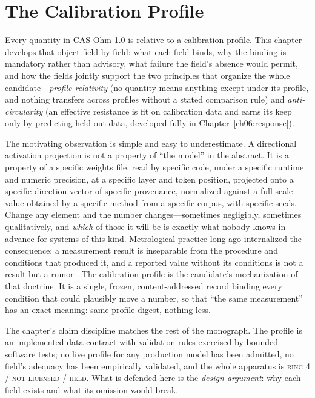 \chapter{The Calibration Profile}\label{ch05:profile}

Every quantity in CAS-Ohm 1.0 is relative to a calibration profile. This
chapter develops that object field by field: what each field binds, why the
binding is mandatory rather than advisory, what failure the field's absence
would permit, and how the fields jointly support the two principles that
organize the whole candidate---\emph{profile relativity} (no quantity means
anything except under its profile, and nothing transfers across profiles
without a stated comparison rule) and \emph{anti-circularity} (an effective
resistance is fit on calibration data and earns its keep only by predicting
held-out data, developed fully in Chapter~\ref{ch06:response}).

The motivating observation is simple and easy to underestimate. A
directional activation projection is not a property of ``the model'' in the
abstract. It is a property of a specific weights file, read by specific
code, under a specific runtime and numeric precision, at a specific layer
and token position, projected onto a specific direction vector of specific
provenance, normalized against a full-scale value obtained by a specific
method from a specific corpus, with specific seeds. Change any element and
the number changes---sometimes negligibly, sometimes qualitatively, and
\emph{which} of those it will be is exactly what nobody knows in advance for
systems of this kind. Metrological practice long ago internalized the
consequence: a measurement result is inseparable from the procedure and
conditions that produced it, and a reported value without its conditions is
not a result but a rumor \cite{vim,gum}. The calibration profile is the
candidate's mechanization of that doctrine. It is a single, frozen,
content-addressed record binding every condition that could plausibly move a
number, so that ``the same measurement'' has an exact meaning: same profile
digest, nothing less.

The chapter's claim discipline matches the rest of the monograph. The
profile is an implemented data contract with validation rules exercised by
bounded software tests; no live profile for any production model has been
admitted, no field's adequacy has been empirically validated, and the whole
apparatus is \textsc{ring 4 / not licensed / held}. What is defended here is
the \emph{design argument}: why each field exists and what its omission
would break.

